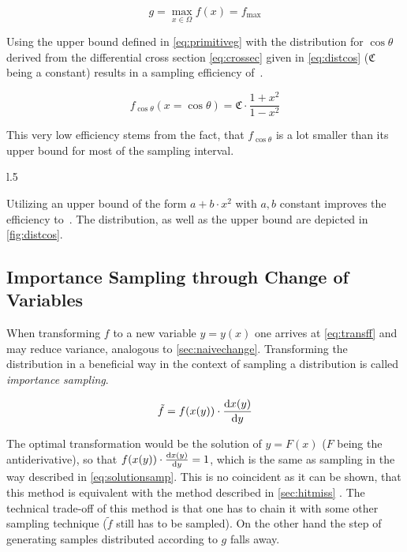 \begin{equation}
  \label{eq:primitiveg}
  g=\max_{x\in\Omega}f(x)=f_{\text{max}}
\end{equation}

Using the upper bound defined in \cref{eq:primitiveg} with the
distribution for \(\cos\theta\) derived from the differential cross
section \cref{eq:crossec} given in \cref{eq:distcos}
(\(\mathfrak{C}\) being a constant) results in a sampling efficiency
of~.

\begin{equation}
  \label{eq:distcos}
  f_{\cos\theta}(x=\cos\theta) = \mathfrak{C}\cdot\frac{1+x^2}{1-x^2}
\end{equation}

This very low efficiency stems from the fact, that \(f_{\cos\theta}\)
is a lot smaller than its upper bound for most of the sampling
interval.

\begin{wrapfigure}[15]{l}{.5\textwidth}
  \caption{\label{fig:distcos} The distribution \cref{eq:distcos} and an upper bound of
    the form \(a + b\cdot x^2\).}
\end{wrapfigure}

Utilizing an upper bound of the form \(a + b\cdot x^2\) with \(a, b\)
constant improves the efficiency
to~. The distribution, as well as the
upper bound are depicted in \cref{fig:distcos}.


\subsection{Importance Sampling through Change of Variables}%
\label{sec:importsamp}

When transforming \(f\) to a new variable \(y=y(x)\) one arrives at
\cref{eq:transff} and may reduce variance, analogous to
\cref{sec:naivechange}. Transforming the distribution in a beneficial
way in the context of sampling a distribution is called
\emph{importance sampling}.

\begin{equation}
  \label{eq:transff}
  \tilde{f} = f(x(y)) \cdot \dv{x(y)}{y}
\end{equation}

The optimal transformation would be the solution of \(y = F(x)\)
(\(F\) being the antiderivative), so that
\(f(x(y)) \cdot \dv{x(y)}{y} = 1\), which is the same as sampling in
the way described in \cref{eq:solutionsamp}. This is no coincident as
it can be shown, that this method is equivalent with the method
described in \cref{sec:hitmiss} \cite{Lepage:19781an}. The technical
trade-off of this method is that one has to chain it with some other
sampling technique (\(\tilde{f}\) still has to be sampled). On the
other hand the step of generating samples distributed according to
\(g\) falls away.


